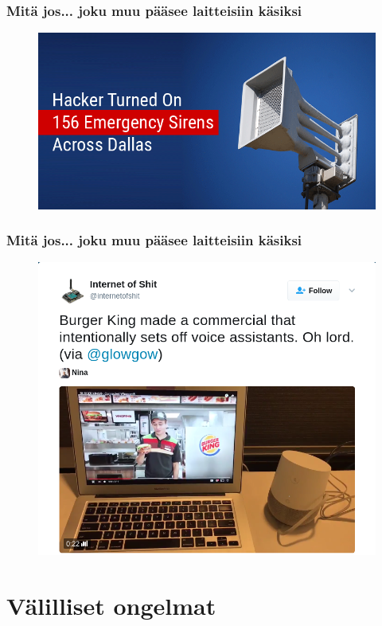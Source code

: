 \documentclass{beamer}
\begin{document}
\begin{frame}
\frametitle{Mitä jos... joku muu pääsee laitteisiin käsiksi}
\begin{figure}
\includegraphics[width=\linewidth]{dallas}
\end{figure}
\end{frame}

\begin{frame}
\frametitle{Mitä jos... joku muu pääsee laitteisiin käsiksi}
\begin{figure}
\includegraphics[width=\linewidth]{burger-king}
\end{figure}
\end{frame}

\section{Välilliset ongelmat}
\end{document}
